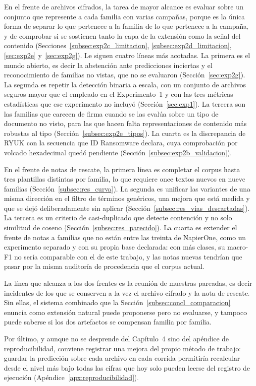 En el frente de archivos cifrados, la tarea de mayor alcance es evaluar sobre un conjunto que represente a cada familia con varias campañas, porque es la única forma de separar lo que pertenece a la familia de lo que pertenece a la campaña, y de comprobar si se sostienen tanto la capa de la extensión como la señal del contenido (Secciones~\ref{subsec:exp2c_limitacion}, \ref{subsec:exp2d_limitacion}, \ref{sec:exp2e} y~\ref{sec:exp2g}). Le siguen cuatro líneas más acotadas. La primera es el mundo abierto, es decir la abstención ante predicciones inciertas y el reconocimiento de familias no vistas, que no se evaluaron (Sección~\ref{sec:exp2g}). La segunda es repetir la detección binaria a escala, con un conjunto de archivos seguros mayor que el empleado en el Experimento~1 y con las tres métricas estadísticas que ese experimento no incluyó (Sección~\ref{sec:exp1}). La tercera son las familias que carecen de firma cuando se las evalúa sobre un tipo de documento no visto, para las que hacen falta representaciones de contenido más robustas al tipo (Sección~\ref{subsec:exp2e_tipos}). La cuarta es la discrepancia de RYUK con la secuencia que ID Ransomware declara, cuya comprobación por volcado hexadecimal quedó pendiente (Sección~\ref{subsec:exp2b_validacion}).

En el frente de notas de rescate, la primera línea es completar el corpus hasta tres plantillas distintas por familia, lo que requiere once textos nuevos en nueve familias (Sección~\ref{subsec:res_curva}). La segunda es unificar las variantes de una misma dirección en el filtro de términos genéricos, una mejora que está medida y que se dejó deliberadamente sin aplicar (Sección~\ref{subsec:res_vias_descartadas}). La tercera es un criterio de casi-duplicado que detecte contención y no solo similitud de coseno (Sección~\ref{subsec:res_parecido}). La cuarta es extender el frente de notas a familias que no están entre las treinta de NapierOne, como un experimento separado y con su propia base declarada: con más clases, su macro-F1 no sería comparable con el de este trabajo, y las notas nuevas tendrían que pasar por la misma auditoría de procedencia que el corpus actual.

La línea que alcanza a los dos frentes es la reunión de muestras pareadas, es decir incidentes de los que se conserven a la vez el archivo cifrado y la nota de rescate. Sin ellas, el sistema combinado que la Sección~\ref{subsec:concl_comparacion} enuncia como extensión natural puede proponerse pero no evaluarse, y tampoco puede saberse si los dos artefactos se compensan familia por familia.

Por último, y aunque no se desprende del Capítulo~4 sino del apéndice de reproducibilidad, conviene registrar una mejora del propio método de trabajo: guardar la predicción sobre cada archivo en cada corrida permitiría recalcular desde el nivel más bajo todas las cifras que hoy solo pueden leerse del registro de ejecución (Apéndice~\ref{apx:reproducibilidad}).
